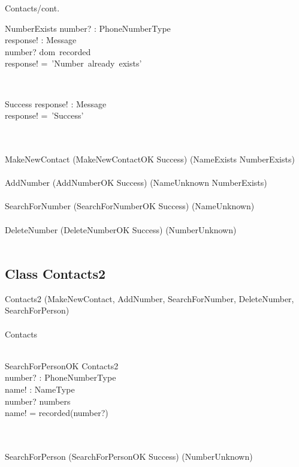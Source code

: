 \documentclass[12pt]{article}
\begin{document}
\begin{spacing}{1.5}
\begin{class}{Contacts/cont.}
\\
\begin{op}{NumberExists}
number? : PhoneNumberType\\
response! : Message\\
\ST
number? \in dom~recorded\\
response! =~'Number~already~exists'
\end{op}\\
\begin{op}{Success}
response! : Message\\
\ST
response! =~'Success'
\end{op}\\
\mbox{}\\
MakeNewContact \sdef (MakeNewContactOK \land Success) \oplus (NameExists \lor NumberExists)  \\
\mbox{}\\
AddNumber \sdef (AddNumberOK \land Success) \oplus (NameUnknown \lor NumberExists)  \\
\mbox{}\\
SearchForNumber \sdef (SearchForNumberOK \land Success) \oplus (NameUnknown)  \\
\mbox{}\\
DeleteNumber \sdef (DeleteNumberOK \land Success) \oplus (NumberUnknown)  \\
\mbox{}\\
\end{class}
\newpage
\subsection{Class Contacts2}
\begin{class}{Contacts2}
\also
\upharpoonright (MakeNewContact, AddNumber, SearchForNumber, DeleteNumber, \\
SearchForPerson) 
\\~\\ Contacts  \\~\\
\begin{op}{SearchForPersonOK}
\Xi Contacts2\\
number? : PhoneNumberType\\
name! : NameType\\
\ST
number? \in numbers\\
name! = recorded(number?)
\end{op}\\
\mbox{}\\
SearchForPerson \sdef (SearchForPersonOK \land Success) \oplus (NumberUnknown)  \\
\mbox{}\\
\end{class}


\end{spacing}
\end{document}
